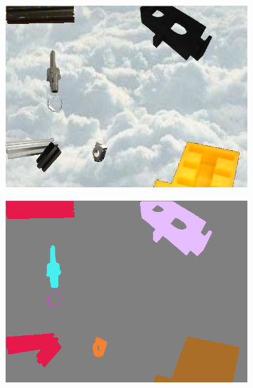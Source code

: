 \begin{figure}[h]
\begin{subfigure}{.24\textwidth}
			\includegraphics[width=1\linewidth]{images/sample_predictions/00017}
		\end{subfigure}
		\begin{subfigure}{.24\textwidth}
			\centering
			\includegraphics[width=1\linewidth]{images/sample_predictions/00017_shape_gt}
		\end{subfigure}
		\begin{subfigure}{.24\textwidth}
			\centering

\end{subfigure}
\end{figure}

